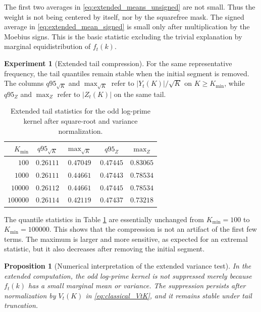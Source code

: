 \documentclass[11pt]{amsart}
\numberwithin{equation}{section}
\theoremstyle{plain}
\newtheorem{proposition}[theorem]{Proposition}
\theoremstyle{definition}
\newtheorem{experiment}[theorem]{Experiment}
\theoremstyle{remark}
\begin{document}
The first two averages in \eqref{eq:extended_means_unsigned} are not
small.  Thus the weight is not being centered by itself, nor by the
squarefree mask.  The signed average in \eqref{eq:extended_mean_signed}
is small only after multiplication by the Moebius signs.  This is the
basic statistic excluding the trivial explanation by marginal
equidistribution of $f_t(k)$.

\begin{experiment}[Extended tail compression]
\label{exp:extended_tail_compression}
For the same representative frequency, the tail quantiles remain stable
when the initial segment is removed.  The columns $q95_{\sqrt K}$ and
$\max_{\sqrt K}$ refer to $|Y_t(K)|/\sqrt K$ on $K\ge K_{\min}$, while
$q95_Z$ and $\max_Z$ refer to $|Z_t(K)|$ on the same tail.
\begin{table}[htbp]
\centering
\begin{tabular}{rcccc}
\hline
$K_{\min}$ & $q95_{\sqrt K}$ & $\max_{\sqrt K}$ & $q95_Z$ & $\max_Z$ \\
\hline
$100$    & $0.26111$ & $0.47049$ & $0.47445$ & $0.83065$ \\
$1000$   & $0.26111$ & $0.44661$ & $0.47443$ & $0.78534$ \\
$10000$  & $0.26112$ & $0.44661$ & $0.47445$ & $0.78534$ \\
$100000$ & $0.26114$ & $0.42119$ & $0.47437$ & $0.73218$ \\
\hline
\end{tabular}
\caption{Extended tail statistics for the odd log-prime kernel after square-root and variance normalization.}
\label{tab:extended_tail_variance_statistics}
\end{table}
\end{experiment}

The quantile statistics in Table \ref{tab:extended_tail_variance_statistics}
are essentially unchanged from $K_{\min}=100$ to $K_{\min}=100000$.
This shows that the compression is not an artifact of the first few terms.
The maximum is larger and more sensitive, as expected for an extremal
statistic, but it also decreases after removing the initial segment.



\begin{proposition}[Numerical interpretation of the extended variance test]
\label{prop:extended_variance_interpretation}
In the extended computation, the odd log-prime kernel is not suppressed
merely because $f_t(k)$ has a small marginal mean or variance.  The
suppression persists after normalization by $V_t(K)$ in
\eqref{eq:classical_VtK}, and it remains stable under tail truncation.
\end{proposition}
\end{document}
